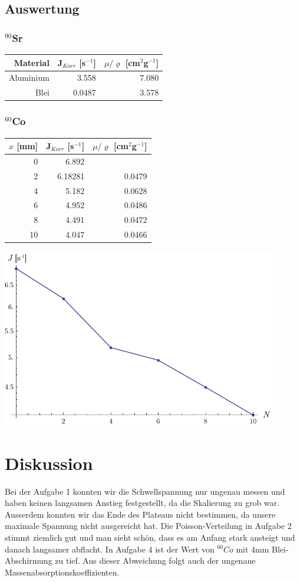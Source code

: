 \documentclass[12pt,a4paper]{article}
\begin{document}
\subsection*{Auswertung}
\subsubsection*{${}^{90}$Sr}
\begin{tabular}{|r|r|r|}
\hline
Material&J$_{Korr}$ [s$^{-1}$]&$\mu /\varrho $ [cm${}^2$g${}^{-1}$]\\
\hline
Aluminium&3.558&7.080\\
Blei&0.0487&3.578\\
\hline
\end{tabular}

\subsubsection*{${}^{60}$Co}
\begin{tabular}{|r|r|r|}
\hline
$x$ [mm]&J$_{Korr}$ [s$^{-1}$]&$\mu /\varrho $ [cm${}^2$g${}^{-1}$]\\
\hline
0&6.892&\\
2&6.18281&0.0479\\
4&5.182&0.0628\\
6&4.952&0.0486\\
8&4.491&0.0472\\
10&4.047&0.0466\\
\hline
\end{tabular}
\begin{center}
\includegraphics[width=12cm]{diagram4.pdf}
\end{center}

\section*{Diskussion}
Bei der Aufgabe 1 konnten wir die Schwellspannung nur ungenau messen und haben keinen langsamen Anstieg festgestellt, da die Skalierung zu grob war. Ausserdem konnten wir das Ende des Plateaus nicht bestimmen, da unsere maximale Spannung nicht ausgereicht hat.
Die Poisson-Verteilung in Aufgabe 2 stimmt ziemlich gut und man sieht sch\"on, dass es am Anfang stark ansteigt und danach langsamer abflacht.
In Aufgabe 4 ist der Wert von $^{60}Co$ mit 4mm Blei-Abschirmung zu tief. Aus dieser Abweichung folgt auch der ungenaue Massenabsorptionskoeffizienten.
\end{document}
